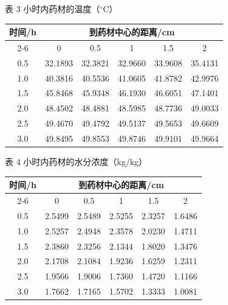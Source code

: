 \documentclass[12pt,a4paper]{ctexart}
\begin{document}
\begin{center}
\begin{minipage}{\textwidth}
\centering
{\heiti{} 表 3 小时内药材的温度（$^\circ$C）}
\par\medskip
{\begin{tabular}{cccccc}
\toprule
时间/h & \multicolumn{5}{c}{到药材中心的距离/cm} \\
\cmidrule(lr){2-6}
 & 0 & 0.5 & 1 & 1.5 & 2 \\
\midrule
0.5 & 32.1893 & 32.3821 & 32.9660 & 33.9608 & 35.4131 \\
1.0 & 40.3816 & 40.5536 & 41.0605 & 41.8782 & 42.9976 \\
1.5 & 45.8468 & 45.9348 & 46.1930 & 46.6051 & 47.1401 \\
2.0 & 48.4502 & 48.4881 & 48.5985 & 48.7736 & 49.0033 \\
2.5 & 49.4670 & 49.4792 & 49.5137 & 49.5653 & 49.6609 \\
3.0 & 49.8495 & 49.8553 & 49.8746 & 49.9101 & 49.9664 \\
\bottomrule
\end{tabular}}
\end{minipage}
\end{center}

\begin{center}
\begin{minipage}{\textwidth}
\centering
{\heiti{} 表 4 小时内药材的水分浓度（kg/kg）}
\par\medskip
{\begin{tabular}{cccccc}
\toprule
时间/h & \multicolumn{5}{c}{到药材中心的距离/cm} \\
\cmidrule(lr){2-6}
 & 0 & 0.5 & 1 & 1.5 & 2 \\
\midrule
0.5 & 2.5499 & 2.5489 & 2.5255 & 2.3257 & 1.6486 \\
1.0 & 2.5257 & 2.4948 & 2.3578 & 2.0230 & 1.4711 \\
1.5 & 2.3860 & 2.3256 & 2.1344 & 1.8020 & 1.3476 \\
2.0 & 2.1708 & 2.1084 & 1.9236 & 1.6259 & 1.2311 \\
2.5 & 1.9566 & 1.9006 & 1.7360 & 1.4720 & 1.1166 \\
3.0 & 1.7662 & 1.7165 & 1.5702 & 1.3333 & 1.0081 \\
\bottomrule
\end{tabular}}
\end{minipage}
\end{center}
\end{document}
